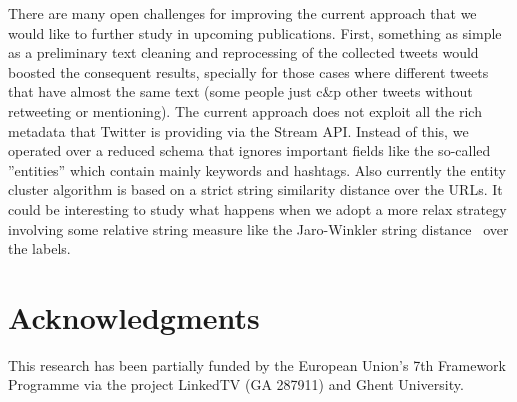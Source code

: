 \documentclass{sig-alternate}
\begin{document}
There are many open challenges for improving the current approach that we would like to further study in upcoming publications. First, something as simple as a preliminary text cleaning and reprocessing of the collected tweets would boosted the consequent results, specially for those cases where different tweets that have almost the same text (some people just c\&p other tweets without retweeting or mentioning). The current approach does not exploit all the rich metadata that Twitter is providing via the Stream API. Instead of this, we operated over a reduced schema that ignores important fields like the so-called ''entities'' which contain mainly keywords and hashtags. Also currently the entity cluster algorithm is based on a strict string similarity distance over the URLs. It could be interesting to study what happens when we adopt a more relax strategy involving some relative string measure like the Jaro-Winkler string distance~\cite{winkler2006overview} over the labels. 

\section*{Acknowledgments}
This research has been partially funded by the European Union's 7th Framework Programme via the project LinkedTV (GA 287911) and Ghent University.



\end{document}
